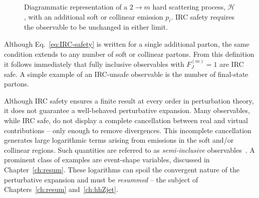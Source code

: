 \begin{figure}[h]
\centering
{}
\caption{Diagrammatic representation of a $2\to m$ hard scattering process, $\mathcal{H}$, with an additional soft or collinear emission $p_i$. IRC safety requires the observable to be unchanged in either 
limit.}
\label{fig:IRC_safety}
\end{figure}

Although Eq.~\eqref{eq:IRC-safety} is written for a single additional parton, the same condition extends to any number of soft or collinear partons. From this definition it follows immediately that fully inclusive observables with $F_J^{(m)} = 1$ are IRC safe. A simple example of an IRC-unsafe observable is the number of final-state partons. 

Although IRC safety ensures a finite result at every order in perturbation theory, it does not guarantee a well-behaved perturbative expansion. Many observables, while IRC safe, do not display a complete cancellation between real and virtual contributions -- only enough to remove divergences. This incomplete cancellation generates large logarithmic terms arising from emissions in the soft and/or collinear regions. Such quantities are referred to as \emph{semi-inclusive} observables~\cite{Bassetto:1983mvz}. A prominent class of examples are event-shape variables, discussed in Chapter~\ref{ch:resum}. These logarithms can spoil the convergent nature of the perturbative expansion and must be \emph{resummed} -- the subject of Chapters~\ref{ch:resum} and~\ref{ch:hhZjet}. 

